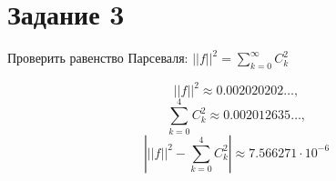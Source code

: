 \section*{Задание 3}
    Проверить равенство Парсеваля: \( ||f||^2 = \sum_{k=0}^{\infty} C_k^2 \)

    \[
        ||f||^2 \approx 0.002020202\dots,
    \]
    \[
        \sum_{k=0}^{4} C_k^2 \approx 0.002012635\dots,
    \]
    \[
        \left| ||f||^2 -  \sum_{k=0}^{4} C_k^2  \right| \approx 7.566271 \cdot 10^{-6}
    \]